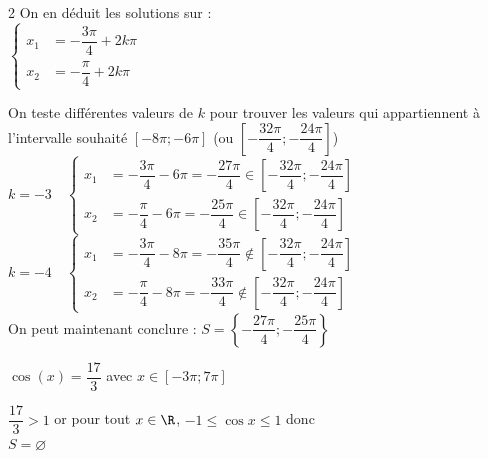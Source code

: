 \documentclass[11pt,a4paper]{article}  %
\begin{document}
\begin{enumMet}
\begin{corrBox}
\begin{multicols}{2}
			\columnbreak
			On en déduit les solutions sur \R:\\
			$\begin{cases}
				x_1 &=-\dfrac{3\pi}{4}+2k\pi\\
				x_2 &=-\dfrac{\pi}{4}+2k\pi\
			\end{cases}$\\
		\end{multicols}
		On teste différentes valeurs de $k$ pour trouver les valeurs qui appartiennent à l'intervalle souhaité $\left[-8\pi;-6\pi\right]$ (ou $\left[-\dfrac{32\pi}{4};-\dfrac{24\pi}{4}\right]$)\\
		$k=-3\quad \begin{cases}
			x_1 &=-\dfrac{3\pi}{4}-6\pi=-\dfrac{27\pi}{4}\in\left[-\dfrac{32\pi}{4};-\dfrac{24\pi}{4}\right]\\
			x_2 &=-\dfrac{\pi}{4}-6\pi=-\dfrac{25\pi}{4}\in\left[-\dfrac{32\pi}{4};-\dfrac{24\pi}{4}\right]
		\end{cases}$\\
		$k=-4\quad \begin{cases}
			x_1 &=-\dfrac{3\pi}{4}-8\pi=-\dfrac{35\pi}{4}\notin\left[-\dfrac{32\pi}{4};-\dfrac{24\pi}{4}\right]\\
			x_2 &=-\dfrac{\pi}{4}-8\pi=-\dfrac{33\pi}{4}\notin\left[-\dfrac{32\pi}{4};-\dfrac{24\pi}{4}\right]
		\end{cases}$\\
		On peut maintenant conclure : $S=\left\{-\dfrac{27\pi}{4};-\dfrac{25\pi}{4}\right\}$
	\end{corrBox}
	\item $\cos(x)=\dfrac{17}{3}$ avec $x\in \left[-3\pi;7\pi\right]$\\
	\begin{corrBox}
		$\dfrac{17}{3}>1$ or pour tout $x \in \R$, $-1\leqslant \cos x\leqslant1$ donc\\
		$S=\varnothing$
	\end{corrBox}
\end{enumMet}
\end{document}
